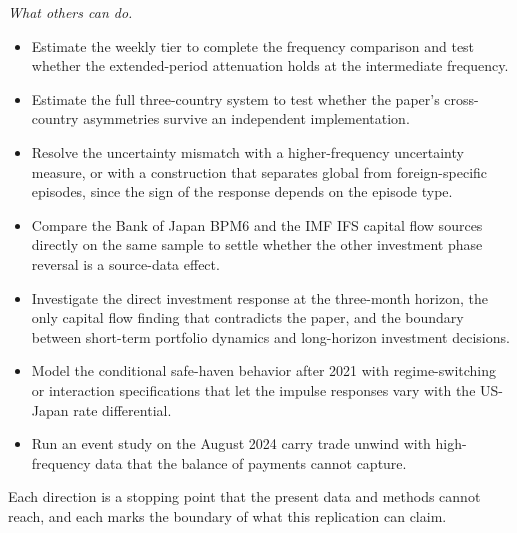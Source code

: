 \textit{What others can do.}

\begin{itemize}
  \item Estimate the weekly tier to complete the frequency comparison and test whether the extended-period attenuation holds at the intermediate frequency.
  \item Estimate the full three-country system to test whether the paper's cross-country asymmetries survive an independent implementation.
  \item Resolve the uncertainty mismatch with a higher-frequency uncertainty measure, or with a construction that separates global from foreign-specific episodes, since the sign of the response depends on the episode type.
  \item Compare the Bank of Japan BPM6 and the IMF IFS capital flow sources directly on the same sample to settle whether the other investment phase reversal is a source-data effect.
  \item Investigate the direct investment response at the three-month horizon, the only capital flow finding that contradicts the paper, and the boundary between short-term portfolio dynamics and long-horizon investment decisions.
  \item Model the conditional safe-haven behavior after 2021 with regime-switching or interaction specifications that let the impulse responses vary with the US-Japan rate differential.
  \item Run an event study on the August 2024 carry trade unwind with high-frequency data that the balance of payments cannot capture.
\end{itemize}

Each direction is a stopping point that the present data and methods cannot reach, and each marks the boundary of what this replication can claim.
